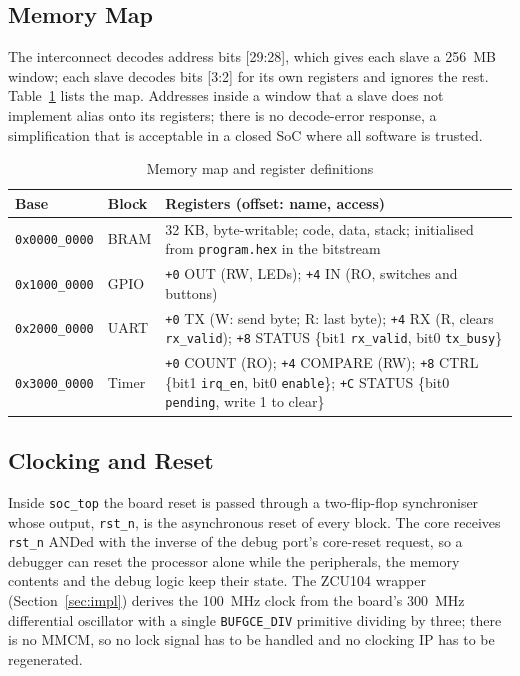 \documentclass[journal,10pt]{IEEEtran}
\newcommand{\reg}[1]{\texttt{#1}}
\begin{document}
\subsection{Memory Map}
The interconnect decodes address bits [29:28], which gives each slave a
256~MB window; each slave decodes bits [3:2] for its own registers and
ignores the rest. Table~\ref{tab:memmap} lists the map. Addresses inside a
window that a slave does not implement alias onto its registers; there is no
decode-error response, a simplification that is acceptable in a closed SoC
where all software is trusted.

\begin{table}[t]
\caption{Memory map and register definitions}
\label{tab:memmap}
\centering
\footnotesize
\begin{tabular}{@{}llp{4.6cm}@{}}
\toprule
Base & Block & Registers (offset: name, access) \\
\midrule
\reg{0x0000\_0000} & BRAM & 32 KB, byte-writable; code, data, stack; initialised from \reg{program.hex} in the bitstream \\
\reg{0x1000\_0000} & GPIO & \reg{+0} OUT (RW, LEDs); \reg{+4} IN (RO, switches and buttons) \\
\reg{0x2000\_0000} & UART & \reg{+0} TX (W: send byte; R: last byte); \reg{+4} RX (R, clears \reg{rx\_valid}); \reg{+8} STATUS \{bit1 \reg{rx\_valid}, bit0 \reg{tx\_busy}\} \\
\reg{0x3000\_0000} & Timer & \reg{+0} COUNT (RO); \reg{+4} COMPARE (RW); \reg{+8} CTRL \{bit1 \reg{irq\_en}, bit0 \reg{enable}\}; \reg{+C} STATUS \{bit0 \reg{pending}, write 1 to clear\} \\
\bottomrule
\end{tabular}
\end{table}

\subsection{Clocking and Reset}
Inside \reg{soc\_top} the board reset is passed through a two-flip-flop
synchroniser whose output, \reg{rst\_n}, is the asynchronous reset of every
block. The core receives \reg{rst\_n} ANDed with the inverse of the debug
port's core-reset request, so a debugger can reset the processor alone while
the peripherals, the memory contents and the debug logic keep their state.
The ZCU104 wrapper (Section~\ref{sec:impl}) derives the 100~MHz clock from
the board's 300~MHz differential oscillator with a single \reg{BUFGCE\_DIV}
primitive dividing by three; there is no MMCM, so no lock signal has to be
handled and no clocking IP has to be regenerated.
\end{document}
